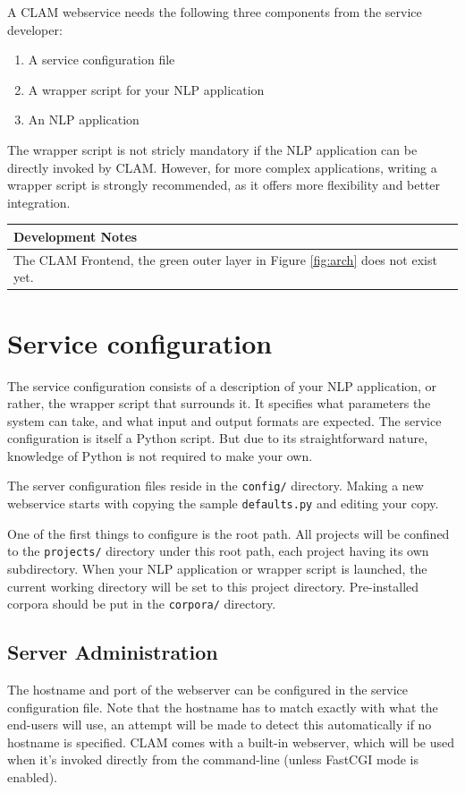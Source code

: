 \documentclass[a4paper,12pt]{report}
\newenvironment{devnotes}
{\newpage
\begin{center}
    \begin{tabular}[h!]{|p{0.8\textwidth}|}
    \hline
    {\bf Development Notes}\\\hline}
{   \\\hline
    \end{tabular}
\end{center}}
\begin{document}
A CLAM webservice needs the following three components from the service developer:

\begin{enumerate}
\item A service configuration file
\item A wrapper script for your NLP application
\item An NLP application
\end{enumerate}

The wrapper script is not stricly mandatory if the NLP application can be directly invoked by CLAM. However, for more complex applications, writing a wrapper script is strongly recommended, as it offers more flexibility and better integration.

\begin{devnotes}
The CLAM Frontend, the green outer layer in Figure \ref{fig:arch} does not exist yet.
\end{devnotes}


\section{Service configuration}

The service configuration consists of a description of your NLP application, or rather, the wrapper script that surrounds it. It specifies what parameters the system can take, and what input and output formats are expected. The service configuration is itself a Python script. But due to its straightforward nature, knowledge of Python is not required to make your own.

The server configuration files reside in the \texttt{config/} directory. Making a new webservice starts with copying the sample \texttt{defaults.py} and editing your copy.

One of the first things to configure is the root path. All projects will be confined to the \texttt{projects/} directory under this root path, each project having its own subdirectory. When your NLP application or wrapper script is launched, the current working directory will be set to this project directory. Pre-installed corpora should be put in the \texttt{corpora/} directory. 


\subsection{Server Administration}
\label{sec:sadmin}

The hostname and port of the webserver can be configured in the service configuration file. Note that the hostname has to match exactly with what the end-users will use, an attempt will be made to detect this automatically if no hostname is specified. CLAM comes with a built-in webserver, which will be used when it's invoked directly from the command-line (unless FastCGI mode is enabled).
\end{document}
